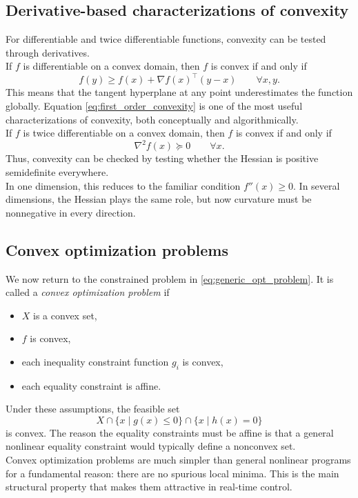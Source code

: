 \subsection{Derivative-based characterizations of convexity}
For differentiable and twice differentiable functions, convexity can be tested through derivatives.\\
If $f$ is differentiable on a convex domain, then $f$ is convex if and only if
$$
    f(y) \geq f(x) + \nabla f(x)^\top (y-x)
    \qquad \forall x,y.
    \label{eq:first_order_convexity}
$$
This means that the tangent hyperplane at any point underestimates the function globally. Equation \eqref{eq:first_order_convexity} is one of the most useful characterizations of convexity, both conceptually and algorithmically.\\
If $f$ is twice differentiable on a convex domain, then $f$ is convex if and only if
$$
    \nabla^2 f(x) \succeq 0
    \qquad \forall x.
$$
Thus, convexity can be checked by testing whether the Hessian is positive semidefinite everywhere.\\
In one dimension, this reduces to the familiar condition $f''(x) \geq 0$. In several dimensions, the Hessian plays the same role, but now curvature must be nonnegative in every direction.

\subsection{Convex optimization problems}
We now return to the constrained problem in \eqref{eq:generic_opt_problem}. It is called a \emph{convex optimization problem} if
\begin{itemize}
    \item $X$ is a convex set,
    \item $f$ is convex,
    \item each inequality constraint function $g_i$ is convex,
    \item each equality constraint is affine.
\end{itemize}
Under these assumptions, the feasible set
$$
    X \cap \{x \mid g(x) \leq 0\} \cap \{x \mid h(x)=0\}
$$
is convex. The reason the equality constraints must be affine is that a general nonlinear equality constraint would typically define a nonconvex set.\\
Convex optimization problems are much simpler than general nonlinear programs for a fundamental reason: there are no spurious local minima. This is the main structural property that makes them attractive in real-time control.\\

